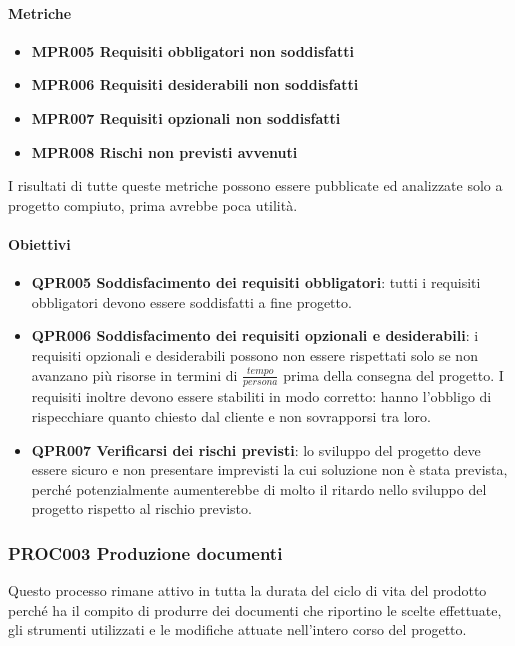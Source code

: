 		\paragraph*{Metriche}
		
		\begin{itemize}
			\item \textbf{MPR005 Requisiti obbligatori non soddisfatti}
			\item \textbf{MPR006 Requisiti desiderabili non soddisfatti}
			\item \textbf{MPR007 Requisiti opzionali non soddisfatti}
			\item \textbf{MPR008 Rischi non previsti avvenuti}
		\end{itemize}
		I risultati di tutte queste metriche possono essere pubblicate ed analizzate solo a progetto compiuto, prima avrebbe poca utilità. 
	
		\paragraph*{Obiettivi}
		
		\begin{itemize}
			\item \textbf{QPR005 Soddisfacimento dei requisiti obbligatori}: tutti i requisiti obbligatori devono essere soddisfatti a fine progetto.
			\item \textbf{QPR006 Soddisfacimento dei requisiti opzionali e desiderabili}: i requisiti opzionali e desiderabili possono non essere rispettati solo se non avanzano più risorse in termini di $ \frac{tempo}{persona} $ prima della consegna del progetto. I requisiti inoltre devono essere stabiliti in modo corretto: hanno l'obbligo di rispecchiare quanto chiesto dal cliente e non sovrapporsi tra loro.
			\item \textbf{QPR007 Verificarsi dei rischi previsti}: lo sviluppo del progetto deve essere sicuro e non presentare imprevisti la cui soluzione non è stata prevista, perché potenzialmente aumenterebbe di molto il ritardo nello sviluppo del progetto rispetto al rischio previsto.
		\end{itemize}
	
	\subsubsection{PROC003 Produzione documenti}
	Questo processo rimane attivo in tutta la durata del ciclo di vita del prodotto perché ha il compito di produrre dei documenti che riportino le scelte effettuate, gli strumenti utilizzati e le modifiche attuate nell'intero corso del progetto.
	
